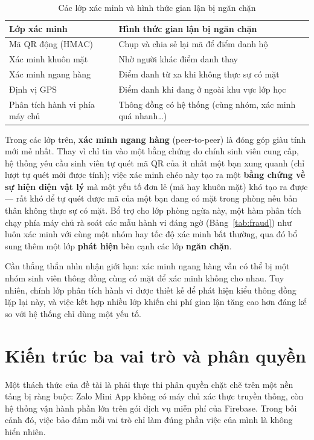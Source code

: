 \documentclass[../main.tex]{subfiles}
\begin{document}
\begin{table}[H]
\centering
\small
\caption{Các lớp xác minh và hình thức gian lận bị ngăn chặn}
\label{tab:defense-layers}
\begin{tabular}{|p{5cm}|p{8.5cm}|}
\hline
\textbf{Lớp xác minh} & \textbf{Hình thức gian lận bị ngăn chặn} \\
\hline
Mã QR động (HMAC) & Chụp và chia sẻ lại mã để điểm danh hộ \\ \hline
Xác minh khuôn mặt & Nhờ người khác điểm danh thay \\ \hline
Xác minh ngang hàng & Điểm danh từ xa khi không thực sự có mặt \\ \hline
Định vị GPS & Điểm danh khi đang ở ngoài khu vực lớp học \\ \hline
Phân tích hành vi phía máy chủ & Thông đồng có hệ thống (cùng nhóm, xác minh quá nhanh\ldots) \\ \hline
\end{tabular}
\end{table}

Trong các lớp trên, \textbf{xác minh ngang hàng} (peer-to-peer) là đóng góp giàu tính mới mẻ
nhất. Thay vì chỉ tin vào một bằng chứng do chính sinh viên cung cấp, hệ thống yêu cầu sinh
viên tự quét mã QR của ít nhất một bạn xung quanh (chỉ lượt tự quét mới được tính); việc xác minh chéo này tạo ra một
\textbf{bằng chứng về sự hiện diện vật lý} mà một yếu tố đơn lẻ (mã hay khuôn mặt) khó tạo ra
được --- rất khó để tự quét được mã của một bạn đang có mặt trong phòng nếu bản thân không thực sự có mặt. Bổ trợ
cho lớp phòng ngừa này, một hàm phân tích chạy phía máy chủ rà soát các mẫu hành vi đáng ngờ
(Bảng~\ref{tab:fraud}) như luôn xác minh với cùng một nhóm hay tốc độ xác minh bất thường, qua
đó bổ sung thêm một lớp \textbf{phát hiện} bên cạnh các lớp \textbf{ngăn chặn}.

Cần thẳng thắn nhìn nhận giới hạn: xác minh ngang hàng vẫn có thể bị một nhóm sinh viên thông
đồng cùng có mặt để xác minh khống cho nhau. Tuy nhiên, chính lớp phân tích hành vi được thiết
kế để phát hiện kiểu thông đồng lặp lại này, và việc kết hợp nhiều lớp khiến chi phí gian lận
tăng cao hơn đáng kể so với hệ thống chỉ dùng một yếu tố.

\section{Kiến trúc ba vai trò và phân quyền}
\label{sec:dg-role}

Một thách thức của đề tài là phải thực thi phân quyền chặt chẽ trên một nền tảng bị ràng buộc:
Zalo Mini App không có máy chủ xác thực truyền thống, còn hệ thống vận hành phần lớn trên gói
dịch vụ miễn phí của Firebase. Trong bối cảnh đó, việc bảo đảm mỗi vai trò chỉ làm đúng phần
việc của mình là không hiển nhiên.
\end{document}
